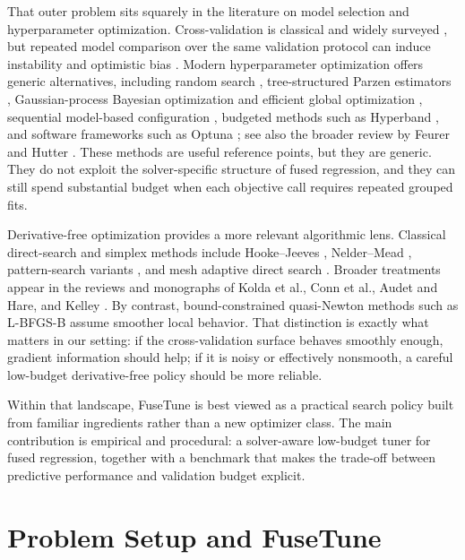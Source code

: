 \documentclass[pdflatex,iicol,sn-mathphys-num]{sn-jnl}
\newcommand{\method}{\textsc{FuseTune}}
\def\textsc#1{#1}%
\def\method{FuseTune}%
\begin{document}
That outer problem sits squarely in the literature on model selection and hyperparameter optimization. Cross-validation is classical \cite{stone1974cv} and widely surveyed \cite{arlot2010cv}, but repeated model comparison over the same validation protocol can induce instability and optimistic bias \cite{cawley2010overfitting,varma2006bias,ambroise2002selectionbias}. Modern hyperparameter optimization offers generic alternatives, including random search \cite{bergstra2012random}, tree-structured Parzen estimators \cite{bergstra2011algorithms}, Gaussian-process Bayesian optimization and efficient global optimization \cite{jones1998ego,snoek2012practicalbo}, sequential model-based configuration \cite{hutter2011smac}, budgeted methods such as Hyperband \cite{li2018hyperband}, and software frameworks such as Optuna \cite{akiba2019optuna}; see also the broader review by Feurer and Hutter \cite{feurer2019hpo}. These methods are useful reference points, but they are generic. They do not exploit the solver-specific structure of fused regression, and they can still spend substantial budget when each objective call requires repeated grouped fits.

Derivative-free optimization provides a more relevant algorithmic lens. Classical direct-search and simplex methods include Hooke--Jeeves \cite{hooke1961direct}, Nelder--Mead \cite{nelder1965simplex}, pattern-search variants \cite{torczon1997pattern,lewis1999patternbound}, and mesh adaptive direct search \cite{audet2006mads}. Broader treatments appear in the reviews and monographs of Kolda et al., Conn et al., Audet and Hare, and Kelley \cite{kolda2003direct,conn2009dfo,audethare2017blackbox,kelley2011implicit}. By contrast, bound-constrained quasi-Newton methods such as L-BFGS-B \cite{byrd1995lbfgsb,zhu1997lbfgsb} assume smoother local behavior. That distinction is exactly what matters in our setting: if the cross-validation surface behaves smoothly enough, gradient information should help; if it is noisy or effectively nonsmooth, a careful low-budget derivative-free policy should be more reliable.

Within that landscape, \method{} is best viewed as a practical search policy built from familiar ingredients rather than a new optimizer class. The main contribution is empirical and procedural: a solver-aware low-budget tuner for fused regression, together with a benchmark that makes the trade-off between predictive performance and validation budget explicit.

\section{Problem Setup and \method{}}\label{sec:method}
\end{document}
